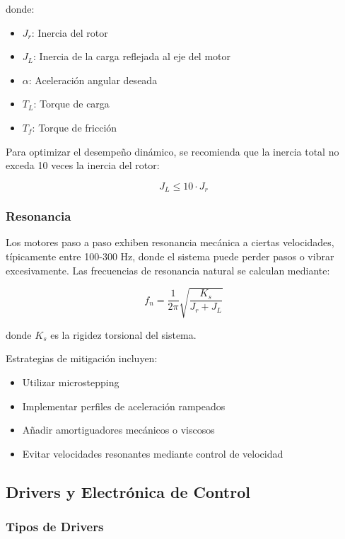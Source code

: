 donde:
\begin{itemize}
    \item $J_r$: Inercia del rotor
    \item $J_L$: Inercia de la carga reflejada al eje del motor
    \item $\alpha$: Aceleración angular deseada
    \item $T_L$: Torque de carga
    \item $T_f$: Torque de fricción
\end{itemize}

Para optimizar el desempeño dinámico, se recomienda que la inercia total no exceda 10 veces la inercia del rotor:

\begin{equation}
J_L \leq 10 \cdot J_r
\end{equation}

\subsubsection{Resonancia}

Los motores paso a paso exhiben resonancia mecánica a ciertas velocidades, típicamente entre 100-300 Hz, donde el sistema puede perder pasos o vibrar excesivamente. Las frecuencias de resonancia natural se calculan mediante:

\begin{equation}
f_n = \frac{1}{2\pi}\sqrt{\frac{K_s}{J_r + J_L}}
\end{equation}

donde $K_s$ es la rigidez torsional del sistema.

Estrategias de mitigación incluyen:
\begin{itemize}
    \item Utilizar microstepping
    \item Implementar perfiles de aceleración rampeados
    \item Añadir amortiguadores mecánicos o viscosos
    \item Evitar velocidades resonantes mediante control de velocidad
\end{itemize}

\subsection{Drivers y Electrónica de Control}

\subsubsection{Tipos de Drivers}

